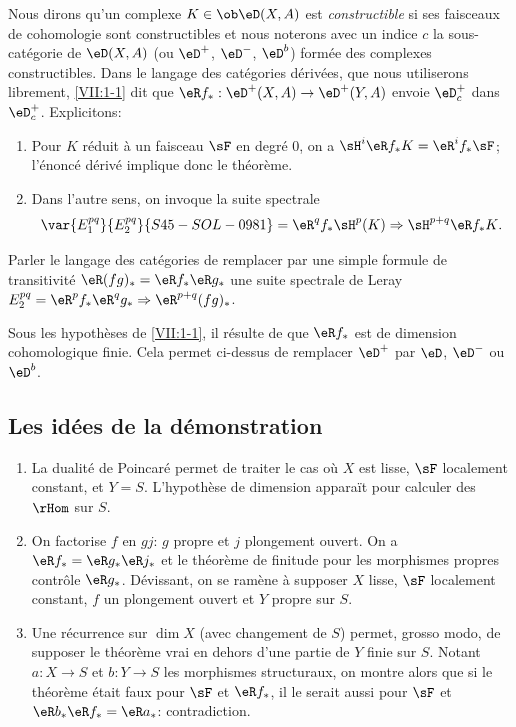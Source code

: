Nous dirons qu'un complexe $K\in\ob\eD(X,A)$ est \emph{constructible} si ses 
faisceaux de cohomologie sont constructibles et nous noterons avec un indice 
$c$ la sous-catégorie de $\eD(X,A)$ (ou $\eD^+$, $\eD^-$, $\eD^b$) formée 
des complexes constructibles. Dans le langage des catégories dérivées, 
que nous utiliserons librement, \ref{VII:1-1} dit que 
$\eR f_\ast:\eD^+(X,A) \to \eD^+(Y,A)$ envoie $\eD_c^+$ dans $\eD_c^+$. 
Explicitons: 
\begin{enumerate}[\indent a)]
  \item Pour $K$ réduit à un faisceau $\sF$ en degré $0$, on a 
    $\sH^i\eR f_\ast K = \eR^i f_\ast \sF$; l'énoncé dérivé implique 
    donc le théorème. 
  \item Dans l'autre sens, on invoque la suite spectrale 
    \[
      \var{E_1^{p q}}{E_2^{p q}}{S45-SOL-0981} = \eR^q f_\ast \sH^p(K) \Rightarrow \sH^{p+q} \eR f_\ast K \text{.} 
    \]
\end{enumerate}

Parler le langage des catégories  de remplacer par 
une simple formule de transitivité $\eR(f g)_\ast = \eR f_\ast \eR g_\ast$ 
une suite spectrale de Leray 
$E_2^{p q} = \eR^p f_\ast \eR^q g_\ast \Rightarrow \eR^{p+q} (f g)_\ast$. 

Sous les hypothèses de \ref{VII:1-1}, il résulte de \cite[X]{sga4} que 
$\eR f_\ast$ est de dimension cohomologique finie. Cela permet ci-dessus de 
remplacer $\eD^+$ par $\eD$, $\eD^-$ ou $\eD^b$. 





\subsection{Les idées de la démonstration}\label{VII:1-4}
\begin{enumerate}[\indent a)]
  \item La dualité de Poincaré permet de traiter le cas où $X$ est 
    lisse, $\sF$ localement constant, et $Y=S$. L'hypothèse de dimension 
    appara\"it pour calculer des $\rHom$ sur $S$.
  \item On factorise $f$ en $g j$: $g$ propre et $j$ plongement ouvert. On a 
    $\eR f_\ast = \eR g_\ast \eR j_\ast$ et le théorème de finitude pour 
    les morphismes propres contrôle $\eR g_\ast$. Dévissant, on se ramène 
    à supposer $X$ lisse, $\sF$ localement constant, $f$ un plongement ouvert 
    et $Y$ propre sur $S$. 
  \item Une récurrence sur $\dim X$ (avec changement de $S$) permet, grosso 
    modo, de supposer le théorème vrai en dehors d'une partie de $Y$ finie 
    sur $S$. Notant $a:X\to S$ et $b:Y\to S$ les morphismes structuraux, on 
    montre alors que si le théorème était faux pour $\sF$ et 
    $\eR f_\ast$, il le serait aussi pour $\sF$ et 
    $\eR b_\ast \eR f_\ast = \eR a_\ast$: contradiction. 
\end{enumerate}





